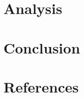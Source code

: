 \documentclass[]{article}
\begin{document}
\section*{Analysis}

\section*{Conclusion}

\section*{References}
\end{document}
